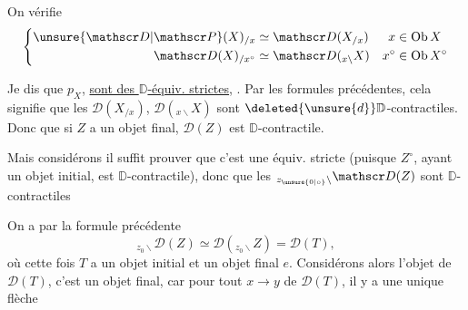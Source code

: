 
On vérifie
\[
\left\{\begin{aligned}
\unsure{\mathscr D|\mathscr P}(X)_{/x}&\simeq\mathscr D(X_{/x}) & x&\in\mathrm{Ob}\,X\\
\mathscr D(X)_{/x^\circ}&\simeq\mathscr D({}_{x\backslash}X) & x^\circ&\in\mathrm{Ob}\,X^\circ
\end{aligned}\right.
\]

Je dis que $p_X$,  \uline{sont des $\mathbb D$-équiv. strictes},  . Par les formules précédentes,  cela signifie que les $\mathscr D(X_{/x})$, $\mathscr D({}_{x\backslash}X)$ sont $\deleted{\unsure{d}}\mathbb D$-contractiles. Donc que si $Z$ a un objet final, $\mathscr D(Z)$ est $\mathbb D$-contractile.

Mais considérons
il suffit   prouver que c'est une équiv. stricte (puisque $Z^\circ$, ayant un objet initial, est $\mathbb D$-contractile), donc que les $ {}_{z_{\unsure{0|\circ}}\backslash}\mathscr D(Z)$ sont $\mathbb D$-contractiles

On a par la formule précédente
\[
{}_{z_0\backslash}\mathscr D(Z)\simeq\mathscr D({}_{z_0\backslash}Z)=\mathscr D(T),
\]
où cette fois $T$ a un objet initial  et  un objet final $e$. Considérons alors l'objet
de $\mathscr D(T)$, c'est un objet final, car \deleted{\unsure{$\forall$}} pour tout $x\longrightarrow y$ de $\mathscr D(T)$, il y a une unique flèche
